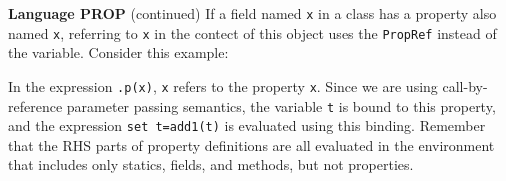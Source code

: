 \begin{minipage}[t]{\sw}
\slidenumber
\LARGE
{\bf Language PROP} (continued)\exx
If a field named \verb'x' in a class has a property also named \verb'x',
referring to \verb'x' in the contect of this object
uses the \verb'PropRef' instead of the variable.
Consider this example:
In the expression \verb'.p(x)', \verb'x' refers
to the property \verb'x'.
Since we are using call-by-reference parameter passing semantics,
the variable \verb't' is bound to this property,
and the expression \verb'set t=add1(t)' is evaluated
using this binding.
Remember that the RHS parts of property definitions
are all evaluated in the environment that includes
only statics, fields, and methods,
but not properties.
\end{minipage}
